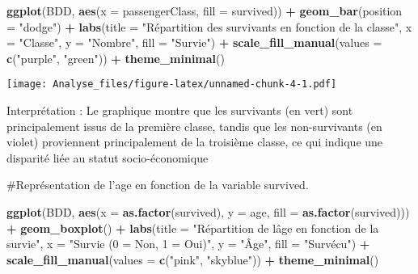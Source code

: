 \documentclass[
]{article}
\newenvironment{Shaded}{\begin{snugshade}}{\end{snugshade}}
\newcommand{\AttributeTok}[1]{\textcolor[rgb]{0.13,0.29,0.53}{#1}}
\newcommand{\FunctionTok}[1]{\textcolor[rgb]{0.13,0.29,0.53}{\textbf{#1}}}
\newcommand{\NormalTok}[1]{#1}
\newcommand{\SpecialCharTok}[1]{\textcolor[rgb]{0.81,0.36,0.00}{\textbf{#1}}}
\newcommand{\StringTok}[1]{\textcolor[rgb]{0.31,0.60,0.02}{#1}}
\begin{document}
\begin{Shaded}
\begin{Highlighting}[]
\FunctionTok{ggplot}\NormalTok{(BDD, }\FunctionTok{aes}\NormalTok{(}\AttributeTok{x =}\NormalTok{ passengerClass, }\AttributeTok{fill =}\NormalTok{ survived)) }\SpecialCharTok{+}
  \FunctionTok{geom\_bar}\NormalTok{(}\AttributeTok{position =} \StringTok{"dodge"}\NormalTok{) }\SpecialCharTok{+}
  \FunctionTok{labs}\NormalTok{(}\AttributeTok{title =} \StringTok{"Répartition des survivants en fonction de la classe"}\NormalTok{,}
       \AttributeTok{x =} \StringTok{"Classe"}\NormalTok{,}
       \AttributeTok{y =} \StringTok{"Nombre"}\NormalTok{,}
       \AttributeTok{fill =} \StringTok{"Survie"}\NormalTok{) }\SpecialCharTok{+}
   \FunctionTok{scale\_fill\_manual}\NormalTok{(}\AttributeTok{values =} \FunctionTok{c}\NormalTok{(}\StringTok{"purple"}\NormalTok{, }\StringTok{"green"}\NormalTok{)) }\SpecialCharTok{+}
  \FunctionTok{theme\_minimal}\NormalTok{()}
\end{Highlighting}
\end{Shaded}

\texttt{[image: Analyse\_files/figure-latex/unnamed-chunk-4-1.pdf]}

Interprétation : Le graphique montre que les survivants (en vert) sont
principalement issus de la première classe, tandis que les
non-survivants (en violet) proviennent principalement de la troisième
classe, ce qui indique une disparité liée au statut socio-économique

\#Représentation de l'age en fonction de la variable survived.

\begin{Shaded}
\begin{Highlighting}[]
\FunctionTok{ggplot}\NormalTok{(BDD, }\FunctionTok{aes}\NormalTok{(}\AttributeTok{x =} \FunctionTok{as.factor}\NormalTok{(survived), }\AttributeTok{y =}\NormalTok{ age, }\AttributeTok{fill =} \FunctionTok{as.factor}\NormalTok{(survived))) }\SpecialCharTok{+}
  \FunctionTok{geom\_boxplot}\NormalTok{() }\SpecialCharTok{+}
  \FunctionTok{labs}\NormalTok{(}\AttributeTok{title =} \StringTok{"Répartition de l\textquotesingle{}âge en fonction de la survie"}\NormalTok{,}
       \AttributeTok{x =} \StringTok{"Survie (0 = Non, 1 = Oui)"}\NormalTok{,}
       \AttributeTok{y =} \StringTok{"Âge"}\NormalTok{,}
       \AttributeTok{fill =} \StringTok{"Survécu"}\NormalTok{) }\SpecialCharTok{+}
  \FunctionTok{scale\_fill\_manual}\NormalTok{(}\AttributeTok{values =} \FunctionTok{c}\NormalTok{(}\StringTok{"pink"}\NormalTok{, }\StringTok{"skyblue"}\NormalTok{)) }\SpecialCharTok{+}
  \FunctionTok{theme\_minimal}\NormalTok{()}
\end{Highlighting}
\end{Shaded}
\end{document}
